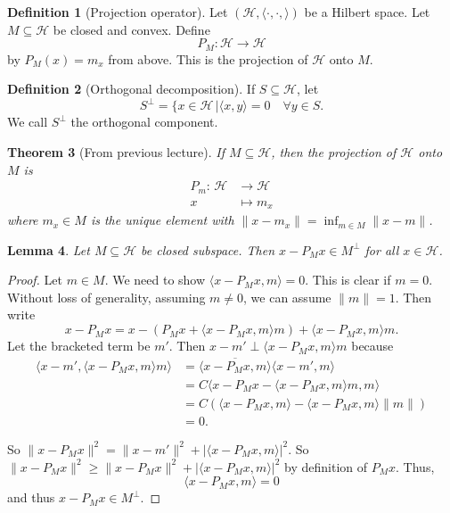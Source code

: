 \documentclass[justified]{tufte-book}
\theoremstyle{plain}%
\newtheorem{thm}{Theorem}[chapter]
\newtheorem{lem}[thm]{Lemma}
\theoremstyle{definition}
\newtheorem{defn}[thm]{Definition}
\theoremstyle{remark}
\renewcommand{\H}{\mathcal{H}}
\newcommand{\mapping}[5]{\begin{align*}
#1 : \,     #2 &\rightarrow #3 \\
		#4  &\mapsto #5
\end{align*}	
}
\newcommand{\hilb}{(\H, \langle \cdot, \cdot, \rangle )}
\begin{document}
\begin{defn}[Projection operator]
Let $\hilb$ be a Hilbert space.  Let $M \subseteq \H$ be closed and convex.  Define \[
  P_M : \H \rightarrow \H
\] by $P_M(x) = m_x$ from above. This is the projection of $\H$ onto $M$.
\end{defn}

\begin{defn}[Orthogonal decomposition]    
  If $S \subseteq \H$, let \[
      S^\perp = \{ x \in \H
 \, | \langle x, y \rangle = 0 \quad \forall y \in S. 
\] We call $S^\perp$ the orthogonal component.
\end{defn}



\begin{thm}[From previous lecture]
  If $M \subseteq \H$, then the projection of $\H$ onto $M$ is \mapping{P_m}{\H}{\H}{x}{m_x} where $m_x \in M$ is the unique element with $\| x - m_x \| = \inf_{m \in M} \| x - m \|$.  
\end{thm}

\begin{lem}
  Let $M \subseteq \H$ be closed subspace.  Then $x - P_M x \in M^{\perp}$ for all $x \in \H$.
\end{lem}

\begin{proof}
  Let $m \in M$.  We need to show $\langle x - P_M x , m \rangle = 0$.  This is clear if $m = 0$.  Without loss of generality, assuming $ m \neq 0$, we can assume $ \| m \| = 1$.  Then write \[
      x - P_M x = x - \left( P_M x + \langle x - P_M x, m \rangle m \right) + \langle x - P_M x, m \rangle m.
  \]   Let the bracketed term be $m'$.  Then $ x- m' \perp \langle x - P_M x, m \rangle m$ because 
  \begin{align*}
      \langle x - m', \langle x - P_M x, m \rangle m \rangle &= \overline{\langle x - P_M x, m \rangle} \langle x - m', m \rangle \\
      &= C \langle x - P_M x - \langle x - P_M x, m \rangle m, m \rangle \\
      &= C( \langle x - P_M x, m \rangle - \langle x - P_M x, m \rangle \| m \|) \\
      &= 0.
  \end{align*}
  
  So $\| x - P_M x \|^2 = \| x - m' \|^2 + | \langle x - P_M x, m \rangle |^2$.  So $\| x - P_M x \|^2 \geq \| x - P_M x\|^2 + | \langle x - P_M x, m \rangle |^2$ by definition of $P_M x$.  Thus, \[
      \langle x - P_M x, m \rangle = 0 
  \] and thus $x - P_M x \in M^\perp$.
\end{proof}
\end{document}
